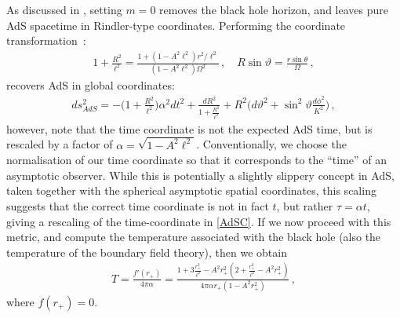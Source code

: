 \documentclass[
twoside,
openright,
frontopenright,
]{dmathesis}
\begin{document}
As discussed in \cite{Appels:2017xoe,Gregory:2017ogk}, setting $m=0$ removes the
black hole horizon, and leaves pure AdS spacetime in Rindler-type coordinates.
Performing the coordinate transformation~\cite{Podolsky:2002nk}:
\begin{align}
1+\frac{R^2}{\ell^2}=\frac{1+(1-A^2\ell^2)r^2/\ell^2}{(1-A^2\ell^2)\Omega^2}\,, \quad
R\sin\vartheta=\frac{r\sin\theta}{\Omega}\,,
\end{align}
recovers AdS in global coordinates:
\begin{align}
\label{gAdS}
 ds^2_{AdS}= -\Big(1+\frac{R^2}{\ell^2}\Big) \alpha^2
dt^2+\frac{dR^2}{1+\frac{R^2}{\ell^2}}  +R^2\Big(d\vartheta^2+\sin^2\vartheta
\frac{d\phi^2}{K^2}\Big)\,,
\end{align}
however, note that the time coordinate is not the expected AdS time, but is
rescaled by a factor of $\alpha = \sqrt{1-A^2 \ell^2}$. Conventionally, we
choose the normalisation of our time coordinate so that it corresponds to
the ``time'' of an asymptotic observer. While this is potentially a slightly slippery
concept in AdS, taken together with the spherical asymptotic spatial coordinates,
this scaling suggests that the correct time coordinate is not in fact $t$, but rather
$\tau=\alpha t$, giving a rescaling of the time-coordinate in \eqref{AdSC}.
If we now proceed with this metric, and compute the temperature
associated with the black hole (also the temperature of the boundary
field theory), then we obtain
\begin{align}
T =\frac{f'(r_+)}{4\pi\alpha}
=\frac{1 + 3\frac{r_+^2}{\ell^2}
- A^2r_+^2 \left (2+\frac{r_+^2}{\ell^2}-A^2r_+^2\right)}
{4\pi \alpha r_+(1-A^2r_+^2)}\,,
\label{temp}
\end{align}
where $f(r_+)=0$.
\end{document}
